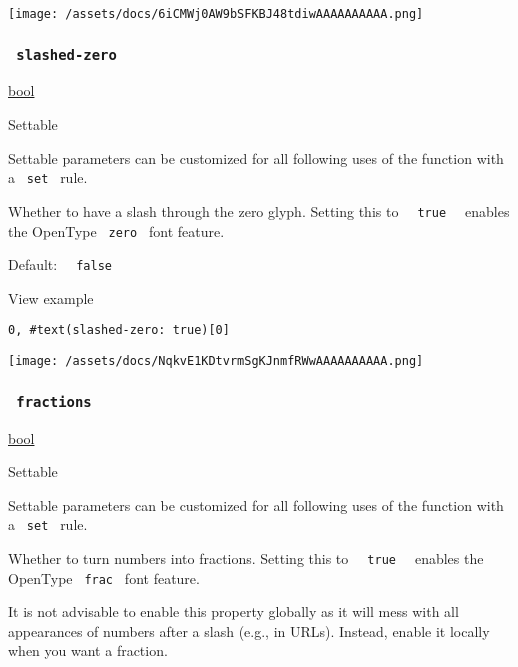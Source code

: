 \texttt{[image: /assets/docs/6iCMWj0AW9bSFKBJ48tdiwAAAAAAAAAA.png]}

\subsubsection{\texorpdfstring{\texttt{\ slashed-zero\ }}{ slashed-zero }}\label{parameters-slashed-zero}

\href{/docs/reference/foundations/bool/}{bool}

{{ Settable }}

\label{parameters-slashed-zero-settable-tooltip}
Settable parameters can be customized for all following uses of the
function with a \texttt{\ set\ } rule.

Whether to have a slash through the zero glyph. Setting this to
\texttt{\ }{\texttt{\ true\ }}\texttt{\ } enables the OpenType
\texttt{\ zero\ } font feature.

Default: \texttt{\ }{\texttt{\ false\ }}\texttt{\ }


View example

\begin{verbatim}
0, #text(slashed-zero: true)[0]
\end{verbatim}

\texttt{[image: /assets/docs/NqkvE1KDtvrmSgKJnmfRWwAAAAAAAAAA.png]}

\subsubsection{\texorpdfstring{\texttt{\ fractions\ }}{ fractions }}\label{parameters-fractions}

\href{/docs/reference/foundations/bool/}{bool}

{{ Settable }}

\label{parameters-fractions-settable-tooltip}
Settable parameters can be customized for all following uses of the
function with a \texttt{\ set\ } rule.

Whether to turn numbers into fractions. Setting this to
\texttt{\ }{\texttt{\ true\ }}\texttt{\ } enables the OpenType
\texttt{\ frac\ } font feature.

It is not advisable to enable this property globally as it will mess
with all appearances of numbers after a slash (e.g., in URLs). Instead,
enable it locally when you want a fraction.

